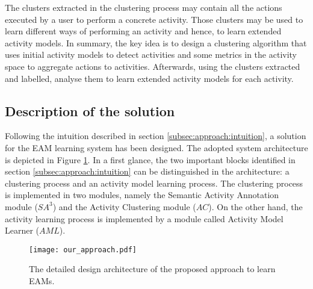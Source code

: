 The clusters extracted in the clustering process may contain all the actions executed by a user to perform a concrete activity. Those clusters may be used to learn different ways of performing an activity and hence, to learn extended activity models. In summary, the key idea is to design a clustering algorithm that uses initial activity models to detect activities and some metrics in the activity space to aggregate actions to activities. Afterwards, using the clusters extracted and labelled, analyse them to learn extended activity models for each activity.


\subsection{Description of the solution}
Following the intuition described in section \ref{subsec:approach:intuition}, a solution for the EAM learning system has been designed. The adopted system architecture is depicted in Figure \ref{fig-design}. In a first glance, the two important blocks identified in section \ref{subsec:approach:intuition} can be distinguished in the architecture: a clustering process and an activity model learning process. The clustering process is implemented in two modules, namely the Semantic Activity Annotation module ($SA^3$) and the Activity Clustering module ($AC$). On the other hand, the activity learning process is implemented by a module called Activity Model Learner ($AML$). 

\begin{figure}[htbp]
\centering
\texttt{[image: our\_approach.pdf]}
    \caption{The detailed design architecture of the proposed approach to learn EAMs.}
    \label{fig-design}
\end{figure}

